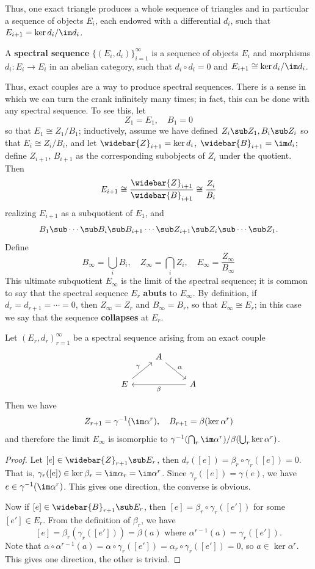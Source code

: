 Thus, one exact triangle produces a whole sequence of triangles and in particular a sequence of objects $E_i$, each endowed with a differential $d_i$, such that 
$E_{i+1}=\ker d_i/\im d_i$.
\begin{definition}
A \textbf{spectral sequence} $\{(E_i,d_i)\}_{i=1}^{\infty}$ is a sequence of objects $E_i$ and morphisms $d_i:E_i\to E_i$ in an abelian category, such that $d_i\circ d_i=0$ and $E_{i+1}\cong\ker d_i/\im d_i$.
\end{definition}
Thus, exact couples are a way to produce spectral sequences. There is a sense in which we can turn the crank infinitely many times; in fact, this can be done with any 
spectral sequence. To see this, let
\[Z_1=E_1,\quad B_1=0\]
so that $E_1\cong Z_1/B_1$; inductively, assume we have defined $Z_i\sub Z_1,B_i\sub Z_i$ so that $E_i\cong Z_i/B_i$, and let $\widebar{Z}_{i+1}=\ker d_i$, 
$\widebar{B}_{i+1}=\im d_i$; define $Z_{i+1}$, $B_{i+1}$ as the corresponding subobjects of $Z_i$ under the quotient. 
Then
\[E_{i+1}\cong\dfrac{\widebar{Z}_{i+1}}{\widebar{B}_{i+1}}\cong\dfrac{Z_i}{B_i}\]
realizing $E_{i+1}$ as a subquotient of $E_1$, and
\[B_1\sub\cdots\sub B_i\sub B_{i+1}\cdots\sub Z_{i+1}\sub Z_i\sub\cdots\sub Z_1.\]
Define
\[B_\infty=\bigcup_{i}B_i,\quad Z_\infty=\bigcap_iZ_i,\quad E_\infty=\dfrac{Z_\infty}{B_\infty}\]
This ultimate subquotient $E_\infty$ is the limit of the spectral sequence; it is common to say that the spectral sequence $E_r$ \textbf{abuts} to $E_\infty$. 
By definition, if $d_r=d_{r+1}=\cdots=0$, then $Z_\infty=Z_r$ and $B_\infty=B_r$, so that $E_\infty\cong E_r$; in this case we say that the sequence \textbf{collapses} 
at $E_r$.
\begin{proposition}\label{spectral seq from ext couple limit}
Let $(E_r,d_r)_{r=1}^{\infty}$ be a spectral sequence arising from an exact couple
\[\begin{tikzcd}
&A\ar[rd,"\alpha"]&\\
E\ar[ru,"\gamma"]&&A\ar[ll,"\beta"]
\end{tikzcd}\]
Then we have 
\[Z_{r+1}=\gamma^{-1}(\im\alpha^r),\quad B_{r+1}=\beta(\ker\alpha^r)\]
and therefore the limit $E_\infty$ is isomorphic to $\gamma^{-1}(\bigcap_r\im\alpha^r)/\beta(\bigcup_r\ker\alpha^r)$.
\end{proposition}
\begin{proof}
Let $[e]\in\widebar{Z}_{r+1}\sub E_r$, then $d_r([e])=\beta_r\circ\gamma_r([e])=0$. That is, $\gamma_r([e])\in\ker\beta_r=\im\alpha_r=\im\alpha^r$. Since $\gamma_r([e])=\gamma(e)$, 
we have $e\in\gamma^{-1}(\im\alpha^r)$. This gives one direction, the converse is obvious.\par
Now if $[e]\in\widebar{B}_{r+1}\sub E_r$, then $[e]=\beta_r\circ\gamma_r([e'])$ for some $[e']\in E_r$. From the definition of $\beta_r$, we have
\[[e]=\beta_r(\gamma_r([e']))=\beta(a)\text{ where }\alpha^{r-1}(a)=\gamma_r([e']).\]
Note that $\alpha\circ\alpha^{r-1}(a)=\alpha\circ\gamma_r([e'])=\alpha_r\circ\gamma_r([e'])=0$, so $a\in\ker\alpha^r$. This gives one direction, the other is trivial.
\end{proof}
